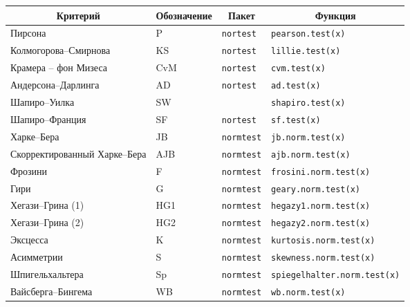 \begin{multicols}{2}
\begin{table*}[b]\small %
\begin{center}
\vspace*{2ex}

\begin{tabular}{|l|l|l|l|}
\hline
\multicolumn{1}{|c|}{Критерий}&\multicolumn{1}{c|}{Обозначение}&
\multicolumn{1}{c|}{Пакет}&\multicolumn{1}{c|}{Функция}\\
\hline
Пирсона&\hspace*{7mm}P&{\tt nortest}&{\tt pearson.test(x)}\\
Колмогорова--Смирнова&\hspace*{7mm}KS&{\tt nortest}&{\tt lillie.test(x)}\\
Крамера -- фон Мизеса&\hspace*{7mm}CvM&{\tt nortest}&{\tt cvm.test(x)}\\
Андерсона--Дарлинга&\hspace*{7mm}AD&{\tt nortest}&{\tt ad.test(x)}\\
Шапиро--Уилка&\hspace*{7mm}SW&&{\tt shapiro.test(x)}\\
Шапиро--Франция&\hspace*{7mm}SF&{\tt nortest}&{\tt sf.test(x)}\\
Харке--Бера&\hspace*{7mm}JB&{\tt normtest}&{\tt jb.norm.test(x)}\\
Скорректированный Харке--Бера&\hspace*{7mm}AJB&{\tt normtest}&{\tt ajb.norm.test(x)}\\
Фрозини&\hspace*{7mm}F&{\tt normtest}&{\tt frosini.norm.test(x)}\\
Гири&\hspace*{7mm}G&{\tt normtest}&{\tt geary.norm.test(x)}\\
Хегази--Грина (1)&\hspace*{7mm}HG1&{\tt normtest}&{\tt hegazy1.norm.test(x)}\\
Хегази--Грина (2)&\hspace*{7mm}HG2&{\tt normtest}&{\tt hegazy2.norm.test(x)}\\
Эксцесса&\hspace*{7mm}K&{\tt normtest}&{\tt kurtosis.norm.test(x)}\\
Асимметрии&\hspace*{7mm}S&{\tt normtest}&{\tt skewness.norm.test(x)}\\
Шпигельхальтера&\hspace*{7mm}Sp&{\tt normtest}&{\tt spiegelhalter.norm.test(x)}\\
Вайсберга--Бингема&\hspace*{7mm}WB&{\tt normtest}&{\tt wb.norm.test(x)}\\
\hline
\end{tabular}
\end{center}
\end{table*}


\end{multicols}

